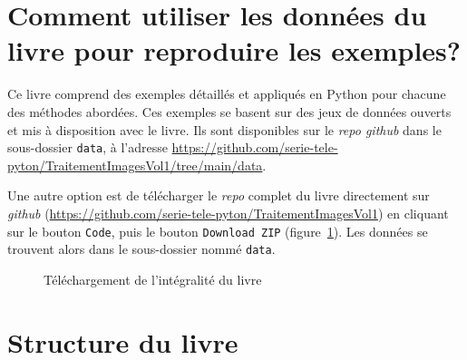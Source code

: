 \documentclass[
  11pt,
  letterpaper,
  open=any,
  twoside=false,
  french]{scrbook}
\begin{document}
\section*{Comment utiliser les données du livre pour reproduire les
exemples?}\label{sect003}


Ce livre comprend des exemples détaillés et appliqués en Python pour
chacune des méthodes abordées. Ces exemples se basent sur des jeux de
données ouverts et mis à disposition avec le livre. Ils sont disponibles
sur le \emph{repo github} dans le sous-dossier \texttt{data}, à
l'adresse
\url{https://github.com/serie-tele-pyton/TraitementImagesVol1/tree/main/data}.

Une autre option est de télécharger le \emph{repo} complet du livre
directement sur \emph{github}
(\url{https://github.com/serie-tele-pyton/TraitementImagesVol1}) en
cliquant sur le bouton \texttt{Code}, puis le bouton
\texttt{Download\ ZIP} (figure~\ref{fig-downloaffromgit}). Les données
se trouvent alors dans le sous-dossier nommé \texttt{data}.

\begin{figure}


\caption{\label{fig-downloaffromgit}Téléchargement de l'intégralité du
livre}

\end{figure}%

\section*{Structure du livre}\label{sect004}
\end{document}
